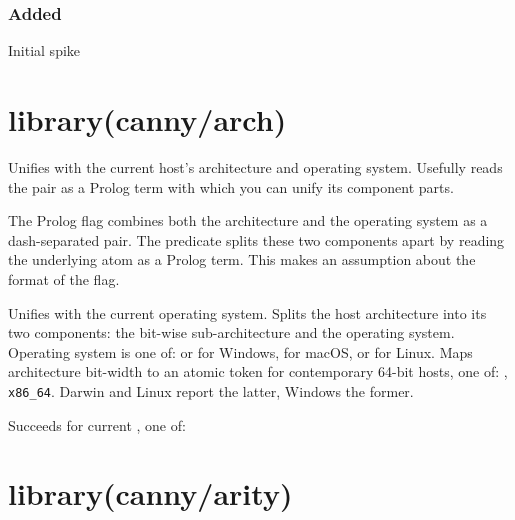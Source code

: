 \subsection{Added}

\begin{shortlist}
    \item Initial spike
\end{shortlist}

\chapter{library(canny/arch)}\label{sec:arch}

\begin{description}
Unifies  with the current host's architecture and operating
system. Usefully reads the pair as a Prolog term with which you can
unify its component parts.

The Prolog  flag combines both the architecture and the
operating system as a dash-separated pair. The predicate splits
these two components apart by reading the underlying atom as a
Prolog term. This makes an assumption about the format of the 
flag.

Unifies  with the current operating system. Splits the host
architecture into its two components: the bit-wise sub-architecture
and the operating system. Operating system is one of:  or
 for Windows,  for macOS, or  for Linux. Maps
architecture bit-width to an atomic  token for contemporary
64-bit hosts, one of: , \verb$x86_64$. Darwin and Linux report the
latter, Windows the former.

Succeeds for current , one of:

\begin{shortlist}
    \item {}
    \item {}
    \item {}
    \item {}
\end{shortlist}
\end{description}

\chapter{library(canny/arity)}\label{sec:arity}


